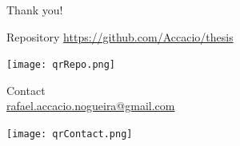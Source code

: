 \documentclass[aspectratio=169]{beamer}
\begin{document}

\appendix

\begin{frame}[plain]
  \centering
  \vfill
  Thank you!
  \vfill
  \begin{minipage}[t]{.45\linewidth}
    \small
    \centering
    Repository
    \href{https://github.com/Accacio/thesis}{https://github.com/Accacio/thesis}

    \texttt{[image: qrRepo.png]}
  \end{minipage}
  \hfill
  \begin{minipage}[t]{.5\linewidth}
    \small
    \centering
    Contact\\
    \href{mailto:rafael.accacio.nogueira@gmail.com?subject=Thesis Defense Presentation}{rafael.accacio.nogueira@gmail.com}

    \texttt{[image: qrContact.png]}
  \end{minipage}
  \fi

\end{frame}
\end{document}
